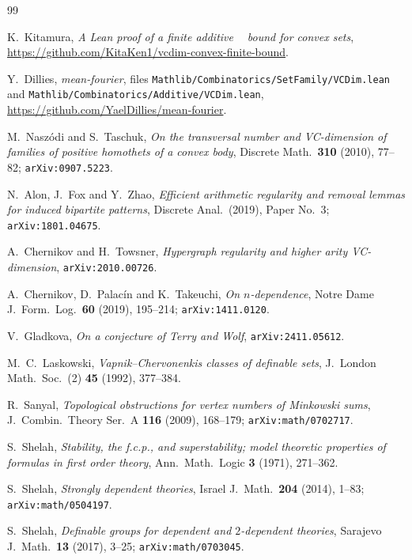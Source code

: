 \documentclass[11pt,a4paper]{article}
\theoremstyle{plain}
\theoremstyle{definition}
\DeclareMathOperator{\VCn}{\mathrm{VC}_n}
\newcommand{\lean}[1]{\texttt{\footnotesize #1}}
\begin{document}
\begin{thebibliography}{99}

K.~Kitamura,
\emph{A Lean proof of a finite additive $\VCn$ bound for convex sets},
\url{https://github.com/KitaKen1/vcdim-convex-finite-bound}.

Y.~Dillies,
\emph{mean-fourier}, files \lean{Mathlib/Combinatorics/SetFamily/VCDim.lean} and
\lean{Mathlib/Combinatorics/Additive/VCDim.lean},
\url{https://github.com/YaelDillies/mean-fourier}.

M.~Naszódi and S.~Taschuk,
\emph{On the transversal number and VC-dimension of families of positive homothets of a convex
body},
Discrete Math.\ \textbf{310} (2010), 77--82;
\texttt{arXiv:0907.5223}.

N.~Alon, J.~Fox and Y.~Zhao,
\emph{Efficient arithmetic regularity and removal lemmas for induced bipartite patterns},
Discrete Anal.\ (2019), Paper No.~3;
\texttt{arXiv:1801.04675}.

A.~Chernikov and H.~Towsner,
\emph{Hypergraph regularity and higher arity VC-dimension},
\texttt{arXiv:2010.00726}.

A.~Chernikov, D.~Palacín and K.~Takeuchi,
\emph{On $n$-dependence},
Notre Dame J.\ Form.\ Log.\ \textbf{60} (2019), 195--214;
\texttt{arXiv:1411.0120}.

V.~Gladkova,
\emph{On a conjecture of Terry and Wolf},
\texttt{arXiv:2411.05612}.

M.~C.~Laskowski,
\emph{Vapnik--Chervonenkis classes of definable sets},
J.\ London Math.\ Soc.\ (2) \textbf{45} (1992), 377--384.

R.~Sanyal,
\emph{Topological obstructions for vertex numbers of Minkowski sums},
J.~Combin.\ Theory Ser.~A \textbf{116} (2009), 168--179;
\texttt{arXiv:math/0702717}.

S.~Shelah,
\emph{Stability, the f.c.p., and superstability; model theoretic properties of formulas in first
order theory},
Ann.\ Math.\ Logic \textbf{3} (1971), 271--362.

S.~Shelah,
\emph{Strongly dependent theories},
Israel J.\ Math.\ \textbf{204} (2014), 1--83;
\texttt{arXiv:math/0504197}.

S.~Shelah,
\emph{Definable groups for dependent and $2$-dependent theories},
Sarajevo J.\ Math.\ \textbf{13} (2017), 3--25;
\texttt{arXiv:math/0703045}.


\end{thebibliography}
\end{document}
